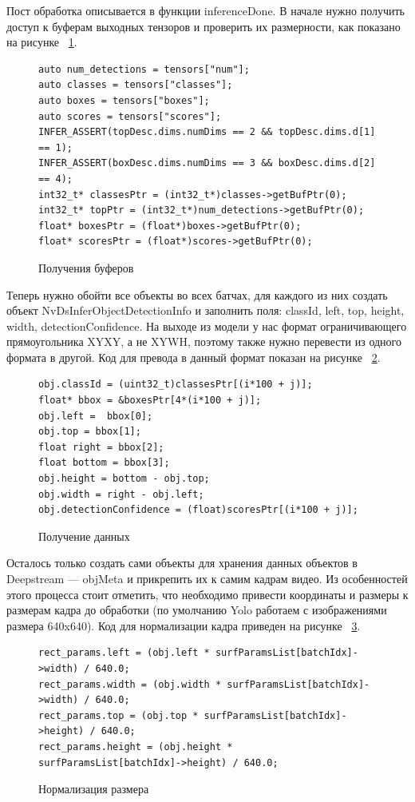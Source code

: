 Пост обработка описывается в функции inferenceDone. В начале нужно получить доступ к буферам выходных тензоров и проверить их размерности, как показано на рисунке ~\ref{src:src2_4}.
\begin{figure}
\begin{lstlisting}
auto num_detections = tensors["num"];
auto classes = tensors["classes"];
auto boxes = tensors["boxes"];
auto scores = tensors["scores"];
INFER_ASSERT(topDesc.dims.numDims == 2 && topDesc.dims.d[1] == 1);
INFER_ASSERT(boxDesc.dims.numDims == 3 && boxDesc.dims.d[2] == 4);
int32_t* classesPtr = (int32_t*)classes->getBufPtr(0);
int32_t* topPtr = (int32_t*)num_detections->getBufPtr(0);
float* boxesPtr = (float*)boxes->getBufPtr(0);
float* scoresPtr = (float*)scores->getBufPtr(0);
\end{lstlisting}
\caption{Получения буферов}
\label{src:src2_4}
\end{figure}

Теперь нужно обойти все объекты во всех батчах, для каждого из них создать объект NvDsInferObjectDetectionInfo и заполнить поля: classId, left, top, height, width, detectionConfidence. На выходе из модели у нас формат ограничивающего прямоугольника XYXY, а не XYWH, поэтому также нужно перевести из одного формата в другой. Код для превода в данный формат показан на рисунке ~\ref{src:src2_5}.

\begin{figure}
\begin{lstlisting}
obj.classId = (uint32_t)classesPtr[(i*100 + j)];
float* bbox = &boxesPtr[4*(i*100 + j)];
obj.left =  bbox[0];
obj.top = bbox[1];
float right = bbox[2];
float bottom = bbox[3];
obj.height = bottom - obj.top;
obj.width = right - obj.left;
obj.detectionConfidence = (float)scoresPtr[(i*100 + j)];
\end{lstlisting}
\caption{Получение данных}
\label{src:src2_5}
\end{figure}

Осталось только создать сами объекты для хранения данных объектов в Deepstream — objMeta и прикрепить их к самим кадрам видео. Из особенностей этого процесса стоит отметить, что необходимо привести координаты и размеры к размерам кадра до обработки (по умолчанию Yolo работаем с изображениями размера 640x640). Код для нормализации кадра приведен на рисунке ~\ref{src:src2_6}.

\begin{figure}
\begin{lstlisting}
rect_params.left = (obj.left * surfParamsList[batchIdx]->width) / 640.0;
rect_params.width = (obj.width * surfParamsList[batchIdx]->width) / 640.0;
rect_params.top = (obj.top * surfParamsList[batchIdx]->height) / 640.0;
rect_params.height = (obj.height * surfParamsList[batchIdx]->height) / 640.0;
\end{lstlisting}
\caption{Нормализация размера}
\label{src:src2_6}
\end{figure}

